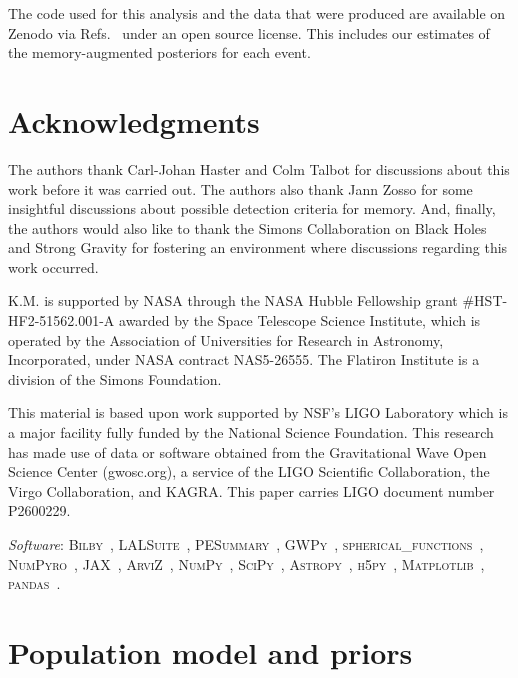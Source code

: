 \documentclass[aps,prd,reprint,twocolumn,10pt,eqsecnum,showpacs,nofootinbib,amsfonts,amssymb,amsmath,longbibliography,superscriptaddress,floatfix]{revtex4-1}
\begin{document}
The code used for this analysis and the data that were produced are available on Zenodo via Refs.~\cite{memory_code,memory_data} under an open source license. This includes our estimates of the memory-augmented posteriors for each event.

\section*{Acknowledgments}

The authors thank Carl-Johan Haster and Colm Talbot for discussions about this work before it was carried out.
The authors also thank Jann Zosso for some insightful discussions about possible detection criteria for memory. And, finally, the authors would also like to thank the Simons Collaboration on Black Holes and Strong Gravity for fostering an environment where discussions regarding this work occurred.

K.M. is supported by NASA through the NASA Hubble Fellowship grant \#HST-HF2-51562.001-A awarded by the Space Telescope Science Institute, which is operated by the Association of Universities for Research in Astronomy, Incorporated, under NASA contract NAS5-26555. The Flatiron Institute is a division of the Simons Foundation.

This material is based upon work supported by NSF’s LIGO Laboratory which is a major facility fully funded by the National Science Foundation. This research has made use of data or software obtained from the Gravitational Wave Open Science Center (gwosc.org), a service of the LIGO Scientific Collaboration, the Virgo Collaboration, and KAGRA. This paper carries LIGO document number P2600229.

\emph{Software}: \textsc{Bilby}~\cite{bilby_paper}, \textsc{LALSuite}~\cite{2020ascl.soft12021L}, \textsc{PESummary}~\cite{Hoy:2020vys}, \textsc{GWPy}~\cite{MACLEOD2021100657}, \textsc{spherical\_functions}~\cite{mike_boyle_2023_7960723}, \textsc{NumPyro}~\cite{bingham2019pyro,Phan:2019NumPyro}, \textsc{JAX}~\cite{jax2018github}, \textsc{ArviZ}~\cite{Martin2026}, \textsc{NumPy}~\cite{numpy}, \textsc{SciPy}~\cite{2020SciPy-NMeth}, \textsc{Astropy}~\cite{astropy:2013,astropy:2018,astropy:2022}, \textsc{h5py}~\cite{the_hdf_group_2026_19194969}, \textsc{Matplotlib}~\cite{Hunter:2007}, \textsc{pandas}~\cite{reback2020pandas}.

\appendix

\section{Population model and priors}
\label{sec:appendix-popmodel}
\end{document}
